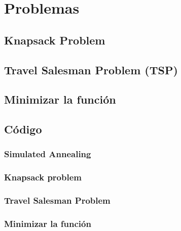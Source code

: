 \documentclass[12pt,twoside]{article}
\begin{document}
	\clearpage
	\section{Problemas}
	
	\subsection{Knapsack Problem}
	
	\subsection{Travel Salesman Problem (TSP)}
	
	\subsection{Minimizar la función}
	
	\subsection{Código}
	
	\subsubsection{Simulated Annealing}
	
	\subsubsection{Knapsack problem}
	
	\subsubsection{Travel Salesman Problem}

	\subsubsection{Minimizar la función}

	\clearpage
	
	
	
\end{document}
